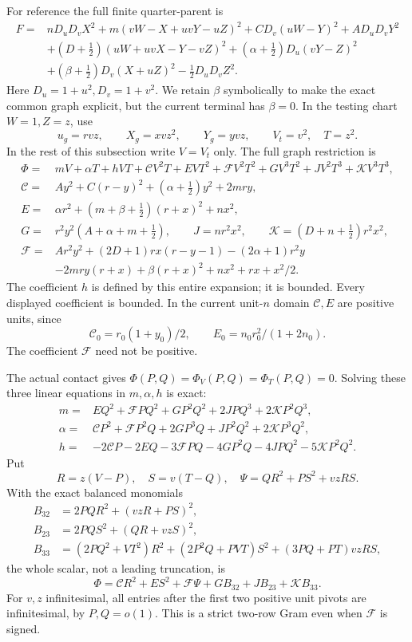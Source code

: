 For reference the full finite quarter-parent is
\[
\begin{aligned}
F={}&nD_uD_vX^2+m(vW-X+uvY-uZ)^2
       +CD_v(uW-Y)^2+AD_uD_vY^2\\
 &+(D+\tfrac12)(uW+uvX-Y-vZ)^2
       +(\alpha+\tfrac12)D_u(vY-Z)^2\\
 &+(\beta+\tfrac12)D_v(X+uZ)^2-\tfrac12D_uD_vZ^2 .
\end{aligned}\tag{WA12}
\]
Here \(D_u=1+u^2,D_v=1+v^2\). We retain \(\beta\) symbolically to make
the exact common graph explicit, but the current terminal has \(\beta=0\).
In the testing chart \(W=1,Z=z\), use
\[
 u_g=rvz,\qquad X_g=xvz^2,\qquad Y_g=yvz,\qquad
 V_t=v^2,\quad T=z^2.
 \tag{WA13}
\]
In the rest of this subsection write \(V=V_t\) only. The full graph
restriction is
\[
\begin{aligned}
\Phi={}&mV+\alpha T+hVT+\mathcal C V^2T+EVT^2
   +\mathcal F V^2T^2+GV^3T^2+JV^2T^3+\mathcal K V^3T^3,\\
\mathcal C={}&Ay^2+C(r-y)^2+(\alpha+\tfrac12)y^2+2mry,\\
E={}&\alpha r^2+(m+\beta+\tfrac12)(r+x)^2+nx^2,\\
G={}&r^2y^2(A+\alpha+m+\tfrac12),\qquad
J=nr^2x^2,\qquad \mathcal K=(D+n+\tfrac12)r^2x^2,\\
\mathcal F={}&Ar^2y^2+(2D+1)rx(r-y-1)-(2\alpha+1)r^2y\\
 &-2mry(r+x)+\beta(r+x)^2+nx^2+rx+x^2/2 .
\end{aligned}\tag{WA14}
\]
The coefficient \(h\) is defined by this entire expansion; it is bounded.
Every displayed coefficient is bounded. In the current unit-\(n\)
domain \(\mathcal C,E\) are positive units, since
\[
 \mathcal C_0=r_0(1+y_0)/2,\qquad
 E_0=n_0r_0^2/(1+2n_0).
 \tag{WA15}
\]
The coefficient \(\mathcal F\) need not be positive.

The actual contact gives \(\Phi(P,Q)=\Phi_V(P,Q)=\Phi_T(P,Q)=0\).
Solving these three linear equations in \(m,\alpha,h\) is exact:
\[
\begin{aligned}
m={}&EQ^2+\mathcal F PQ^2+GP^2Q^2+2JPQ^3+2\mathcal K P^2Q^3,\\
\alpha={}&\mathcal C P^2+\mathcal F P^2Q+2GP^3Q
                         +JP^2Q^2+2\mathcal K P^3Q^2,\\
h={}&-2\mathcal CP-2EQ-3\mathcal FPQ-4GP^2Q
                         -4JPQ^2-5\mathcal K P^2Q^2 .
\end{aligned}\tag{WA16}
\]
Put
\[
 R=z(V-P),\quad S=v(T-Q),\quad
 \Psi=QR^2+PS^2+vzRS .
\]
With the exact balanced monomials
\[
\begin{aligned}
B_{32}&=2PQR^2+(vzR+PS)^2,\\
B_{23}&=2PQS^2+(QR+vzS)^2,\\
B_{33}&=(2PQ^2+VT^2)R^2+(2P^2Q+PVT)S^2
                              +(3PQ+PT)vzRS,
\end{aligned}\tag{WA17}
\]
the whole scalar, not a leading truncation, is
\[
 \Phi=\mathcal CR^2+ES^2+\mathcal F\Psi
                          +GB_{32}+JB_{23}+\mathcal K B_{33}.
 \tag{WA18}
\]
For \(v,z\) infinitesimal, all entries after the first two positive
unit pivots are infinitesimal, by \(P,Q=o(1)\). This is a strict
two-row Gram even when \(\mathcal F\) is signed.

